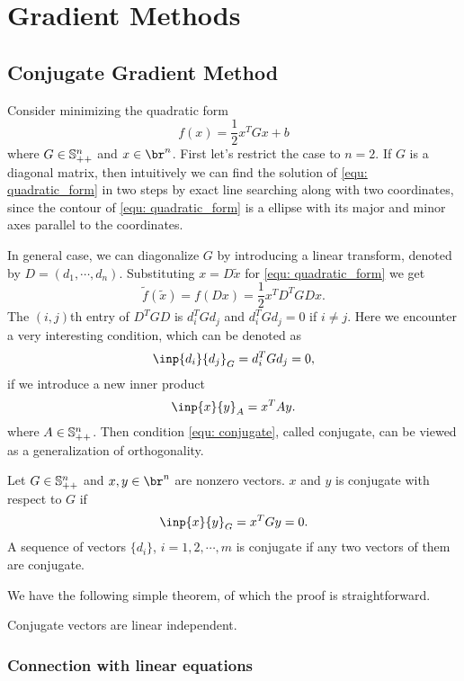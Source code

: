 \chapter{Gradient Methods}

\section{Conjugate Gradient Method}
Consider minimizing the quadratic form 
\begin{equation}
\label{equ: quadratic_form}
    f(x) = \frac{1}{2}x^TGx + b
\end{equation}
where $G \in \mathbb{S}^n_{++}$ and $x \in \br^n$. First let's restrict the case 
to $n=2$. If $G$ is a diagonal matrix, then intuitively we can find the 
solution of \ref{equ: quadratic_form} in two steps by exact line searching 
along with two coordinates, since the contour of \ref{equ: quadratic_form} 
is a ellipse with its major and minor axes parallel to the coordinates. 

In general case, we can diagonalize $G$ by introducing a linear transform, 
denoted by $D = (d_1, \cdots, d_n)$. 
Substituting $x = D\tilde x$ for \ref{equ: quadratic_form} we get 
\begin{equation}
    \tilde{f}(\tilde x) = f(Dx)
    = \frac{1}{2} x^TD^T G Dx. 
\end{equation}
The $(i, j)$th entry of $D^TGD$ is $d_i^T G d_j$ and $d_i^TGd_j = 0$ 
if $i \neq j$. Here we encounter a very interesting condition, which can be 
denoted as 
\begin{equation}
\label{equ: conjugate}
    \inp{d_i}{d_j}_G = d_i^TGd_j = 0, 
\end{equation}
if we introduce a new inner product 
\begin{equation}
    \inp{x}{y}_A = x^TAy.
\end{equation}
where $A \in \mathbb{S}^n_{++}$. Then condition \ref{equ: conjugate}, called 
conjugate, can be viewed as a generalization of orthogonality. 

\begin{defn}
Let $G \in \mathbb{S}^n_{++}$ and $x, y \in \br ^n$ are nonzero vectors. $x$ and 
$y$ is conjugate with respect to $G$ if 
\begin{equation}
    \inp{x}{y}_G = x ^T G y = 0.
\end{equation}
A sequence of vectors $\{d_i\}$, $i = 1, 2, \cdots, m$ is conjugate if 
any two vectors of them are conjugate. 
\end{defn}

We have the following simple theorem, of which the proof is straightforward.
\begin{thm}
Conjugate vectors are linear independent. 
\end{thm}


\subsection{Connection with linear equations}